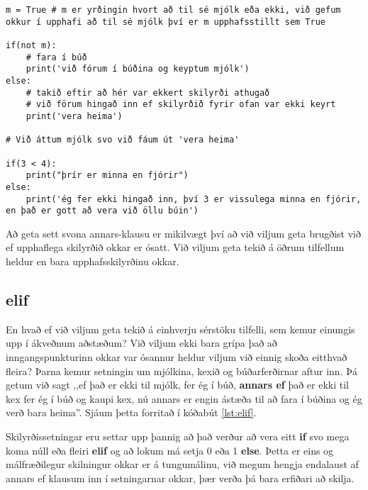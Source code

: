 \begin{lstlisting}[caption=else notað, label=lst:else]
m = True # m er yrðingin hvort að til sé mjólk eða ekki, við gefum okkur í upphafi að til sé mjólk því er m upphafsstillt sem True

if(not m):
	# fara í búð
	print('við fórum í búðina og keyptum mjólk')
else:
	# takið eftir að hér var ekkert skilyrði athugað
	# við förum hingað inn ef skilyrðið fyrir ofan var ekki keyrt
	print('vera heima')

# Við áttum mjólk svo við fáum út 'vera heima'

if(3 < 4):
	print("þrír er minna en fjórir")
else:
	print('ég fer ekki hingað inn, því 3 er vissulega minna en fjórir, en það er gott að vera við öllu búin')
\end{lstlisting}

Að geta sett svona annars-klausu er mikilvægt því að við viljum geta brugðist við ef upphaflega skilyrðið okkar er ósatt.
Við viljum geta tekið á öðrum tilfellum heldur en bara upphafsskilyrðinu okkar.

\subsection{elif}
En hvað ef við viljum geta tekið á einhverju sérstöku tilfelli, sem kemur einungis upp í ákveðnum aðstæðum?
Við viljum ekki bara grípa það að inngangspunkturinn okkar var ósannur heldur viljum við einnig skoða eitthvað fleira?
Þarna kemur setningin um mjólkina, kexið og búðarferðirnar aftur inn.
Þá getum við sagt ,,ef það er ekki til mjólk, fer ég í búð, \textbf{annars ef} það er ekki til kex fer ég í búð og kaupi kex, nú annars er engin ástæða til að fara í búðina og ég verð bara heima''.
Sjáum þetta forritað í kóðabút \ref{lst:elif}.

Skilyrðissetningar eru settar upp þannig að það verður að vera eitt \textbf{if} svo mega koma núll eða fleiri \textbf{elif} og að lokum má setja 0 eða 1 \textbf{else}.
Þetta er eins og málfræðilegur skilningur okkar er á tungumálinu, við megum hengja endalaust af annars ef klausum inn í setningarnar okkar, þær verða þá bara erfiðari að skilja.

